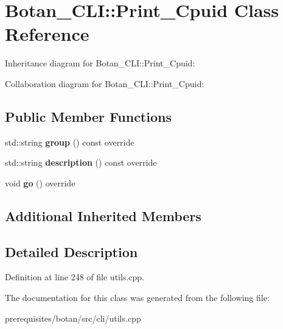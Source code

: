 \hypertarget{class_botan___c_l_i_1_1_print___cpuid}{}\section{Botan\+\_\+\+C\+LI\+:\+:Print\+\_\+\+Cpuid Class Reference}
\label{class_botan___c_l_i_1_1_print___cpuid}


Inheritance diagram for Botan\+\_\+\+C\+LI\+:\+:Print\+\_\+\+Cpuid\+:


Collaboration diagram for Botan\+\_\+\+C\+LI\+:\+:Print\+\_\+\+Cpuid\+:
\subsection*{Public Member Functions}
\begin{DoxyCompactItemize}
\item 
\mbox{\label{class_botan___c_l_i_1_1_print___cpuid_a74f227bc50f8dbe7930c4c16b16a2bf8}} 
std\+::string {\bfseries group} () const override
\item 
\mbox{\label{class_botan___c_l_i_1_1_print___cpuid_aadab4f5366759a56d209006a85c6d8b2}} 
std\+::string {\bfseries description} () const override
\item 
\mbox{\label{class_botan___c_l_i_1_1_print___cpuid_a64d00a652b6282755d3e09afee111a88}} 
void {\bfseries go} () override
\end{DoxyCompactItemize}
\subsection*{Additional Inherited Members}


\subsection{Detailed Description}


Definition at line 248 of file utils.\+cpp.



The documentation for this class was generated from the following file\+:\begin{DoxyCompactItemize}
\item 
prerequisites/botan/src/cli/utils.\+cpp\end{DoxyCompactItemize}
